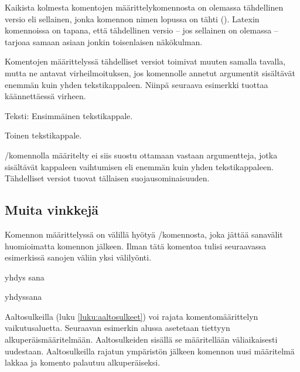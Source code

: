Kaikista kolmesta komentojen määrittelykomennosta on olemassa
tähdellinen versio eli sellainen, jonka komennon nimen lopussa on tähti
(\koodi{*}). Latexin komennoissa on tapana, että tähdellinen versio --
jos sellainen on olemassa -- tarjoaa samaan asiaan jonkin toisenlaisen
näkökulman.

\begin{koodilohkosis}
  \newcommand*     {\nimi}[n][oletus]{määritelmä}
  \renewcommand*   {\nimi}[n][oletus]{määritelmä}
  \providecommand* {\nimi}[n][oletus]{määritelmä}
\end{koodilohkosis}

Komentojen määrittelyssä tähdelliset versiot toimivat muuten samalla
tavalla, mutta ne antavat virheilmoituksen, jos komennolle annetut
argumentit sisältävät enemmän kuin yhden tekstikappaleen. Niinpä
seuraava esimerkki tuottaa käännettäessä virheen.

\begin{koodilohkosis}
  \newcommand*{\komento}[1]{Teksti: #1}

  \komento{
    Ensimmäinen tekstikappale.

    Toinen tekstikappale.
  }
\end{koodilohkosis}

\-/komennolla määritelty 
ei siis suostu ottamaan vastaan argumentteja, jotka sisältävät kappaleen
vaihtumisen eli enemmän kuin yhden tekstikappaleen. Tähdelliset versiot
tuovat tällaisen suo\-jaus\-omi\-nai\-suu\-den.

\subsection{Muita vinkkejä}
\label{luku:komennot-lisä}

Komennon määrittelyssä on välillä hyötyä \-/komennosta, joka jättää sanavälit huomioimatta
komennon jälkeen. Ilman tätä komentoa tulisi seuraavassa esimerkissä
sanojen väliin yksi välilyönti.

\pagebreak[3]

\begin{koodilohkosis}
  \newcommand{\komento}[1]{#1\ignorespaces}
  \komento{yhdys}       sana
\end{koodilohkosis}

\begin{tulossis}
  yhdyssana
\end{tulossis}

Aaltosulkeilla (luku \ref{luku:aaltosulkeet}) voi rajata
komentomäärittelyn vai\-ku\-tus\-aluet\-ta. Seuraavan esimerkin alussa
asetetaan  tiettyyn alkuperäismääritelmään.
Aaltosulkeiden sisällä se määritellään väliaikaisesti uudestaan.
Aaltosulkeilla rajatun ympäristön jälkeen komennon uusi määritelmä
lakkaa ja komento palautuu alkuperäiseksi.

